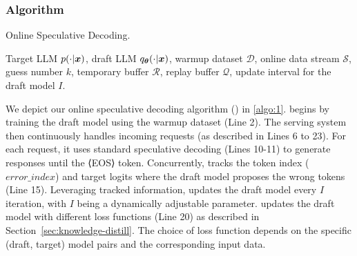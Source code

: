 \subsubsection{Algorithm}
\begin{algorithm}[t] 
\caption{Online Speculative Decoding.} 
\label{algo:1}
\small
\begin{algorithmic}[1]
Target LLM $p(\cdot|{\bm{x}})$, draft LLM $q_{\bm{\theta}}(\cdot|{\bm{x}})$, warmup dataset $\mathcal{D}$, online data stream $\mathcal{S}$, guess number $k$, temporary buffer $\mathcal{R}$, replay buffer $\mathcal{Q}$, update interval for the draft model $I$.
    \STATE{$\vx \leftarrow [\vx, {\vy}_{<a+2}]$;}
    \ENDWHILE
    \ENDIF
\ENDWHILE
\end{algorithmic}
\end{algorithm}

We depict our online speculative decoding algorithm (\tool) in \cref{algo:1}.
\tool begins by training the draft model using the warmup dataset (Line 2). 
The serving system then continuously handles incoming requests (as described in Lines 6 to 23).
For each request, it uses standard speculative decoding (Lines 10-11) to generate responses until the ⟨EOS⟩ token. 
Concurrently, \tool tracks the token index ($error\_index$) and target logits where the draft model proposes the wrong tokens (Line 15). 
Leveraging tracked information, \tool updates the draft model every $I$ iteration, with $I$ being a dynamically adjustable parameter.
\tool updates the draft model with different loss functions (Line 20) as described in Section~\ref{sec:knowledge-distill}.
The choice of loss function depends on the specific (draft, target) model pairs and the corresponding input data. 


